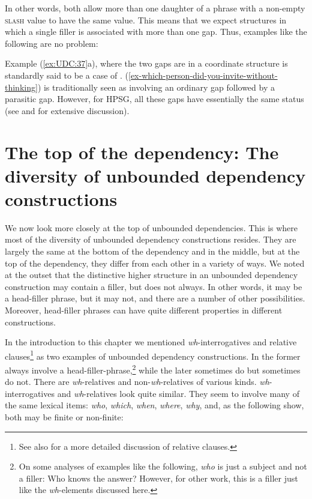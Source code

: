 \documentclass[output=paper,biblatex,babelshorthands,newtxmath,draftmode,colorlinks,citecolor=brown]{langscibook}
\begin{document}
\noindent
In other words, both allow more than one daughter of a phrase with a
non-empty \textsc{slash} value to have the same value. This means that we expect
structures in which a single filler is associated with more than one
gap. Thus, examples like the following are no problem:

\begin{exe} \ex \begin{xlist} \label{ex:UDC:37}

\end{xlist}
\end{exe}

\noindent
Example (\ref{ex:UDC:37}a), where the two gaps are in a coordinate structure
is standardly said to be a case of  {\citep{Ross67a,Williams78a}}. (\ref{ex-which-person-did-you-invite-without-thinking}) is traditionally seen as involving an
ordinary gap followed by a parasitic gap. However, for HPSG, all these
gaps have essentially the same status (see \citealt{Levine:Hukari:06}
and \citealt{Chaves:12} for extensive discussion).

\section{The top of the dependency: The diversity of unbounded
dependency constructions}
\label{sec:UDC:Top}

We now look more closely at the top of unbounded dependencies. This is
where most of the diversity of unbounded dependency constructions
resides. They are largely the same at the bottom of the dependency and
in the middle, but at the top of the dependency, they differ from each
other in a variety of ways. We noted at the outset that the
distinctive higher structure in an unbounded dependency construction
may contain a filler, but does not always. In other words, it may be a
head-filler phrase, but it may not, and there are a number of other
possibilities. Moreover, head-filler phrases can have quite different
properties in different constructions.

In the introduction to this chapter we mentioned
\emph{wh}-interrogatives and relative clauses\footnote{
{See also  for a more detailed discussion of relative clauses.}} as two examples of
unbounded dependency constructions. In  the former always involve
a head-filler-phrase,\footnote{On some analyses of examples like the
  following, \emph{who} is just a subject and not a filler:
\ea
Who knows the answer?
\z
However, for other work, this is a filler just like the
  \emph{wh}-elements discussed here.
} while the later sometimes do but
sometimes do not. There are \emph{wh}-relatives and
non-\emph{wh}-relatives of various kinds. 
\emph{wh}-interrogatives and \emph{wh}-relatives look quite similar.
They seem to involve many of the same lexical items: \emph{who},
\emph{which}, \emph{when}, \emph{where}, \emph{why}, and, as the
following show, both may be finite or non-finite:
\end{document}

